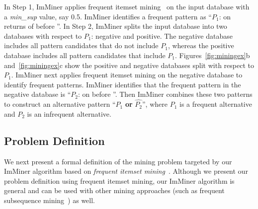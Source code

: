 In Step 1, ImMiner applies frequent itemset mining~\cite{Burdick01mafia} on the input database with a \emph{min\_sup} value, say 0.5. ImMiner identifies a frequent pattern as ``$P_1$:  on returns of  before ''. In Step 2, ImMiner splits the input database into two databases with respect to $P_1$: negative and positive. The negative database includes all pattern candidates that do not include $P_1$, whereas the positive database includes all pattern candidates that include $P_1$. Figures~\ref{fig:miningex}b and~\ref{fig:miningex}c show the positive and negative databases split with respect to $P_1$. ImMiner next applies frequent itemset mining on the negative database to identify frequent patterns. ImMiner identifies that the frequent pattern in the negative database is  ``$P_2$:  on  before ''. Then ImMiner combines these two patterns to construct an alternative pattern ``$P_1$ \textbf{or} $\hat{P_2}$'', where $P_1$ is a frequent alternative and $P_2$ is an infrequent alternative.

\subsection{Problem Definition}
\label{sec:probdef}

We next present a formal definition of the mining problem targeted by our ImMiner algorithm based on \emph{frequent itemset mining}~\cite{Burdick01mafia}. Although we present our problem definition using frequent itemset mining, our ImMiner algorithm is general and can be used with other mining approaches (such as frequent subsequence mining~\cite{wang:bide}) as well.

